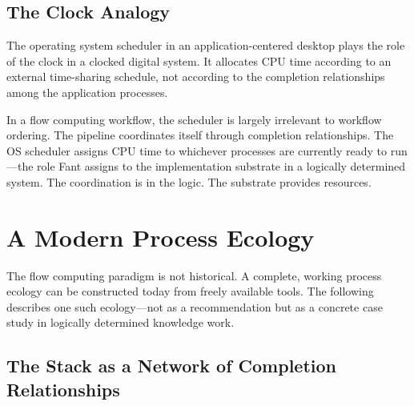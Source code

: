 \documentclass[12pt, a4paper]{article}
\begin{document}
\subsection{The Clock Analogy}

The operating system scheduler in an application-centered desktop
plays the role of the clock in a clocked digital system. It allocates
CPU time according to an external time-sharing schedule, not according
to the completion relationships among the application processes.

In a flow computing workflow, the scheduler is largely irrelevant to
workflow ordering. The pipeline coordinates itself through completion
relationships. The OS scheduler assigns CPU time to whichever
processes are currently ready to run---the role Fant assigns to the
implementation substrate in a logically determined system. The
coordination is in the logic. The substrate provides resources.

\section{A Modern Process Ecology}

The flow computing paradigm is not historical. A complete, working
process ecology can be constructed today from freely available tools.
The following describes one such ecology---not as a recommendation
but as a concrete case study in logically determined knowledge work.

\subsection{The Stack as a Network of Completion Relationships}

\begin{center}
\end{center}
\end{document}
